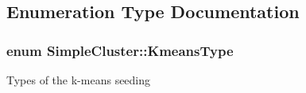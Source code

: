 \subsection{Enumeration Type Documentation}
\hypertarget{namespaceSimpleCluster_a8a8f57121b69a7b43575e4d6a53928e2}{
\subsubsection[{Kmeans\-Type}]{\setlength{\rightskip}{0pt plus 5cm}enum {\bf Simple\-Cluster\-::\-Kmeans\-Type}\hspace{0.3cm}{\ttfamily [strong]}}}\label{namespaceSimpleCluster_a8a8f57121b69a7b43575e4d6a53928e2}
Types of the k-\/means seeding 

